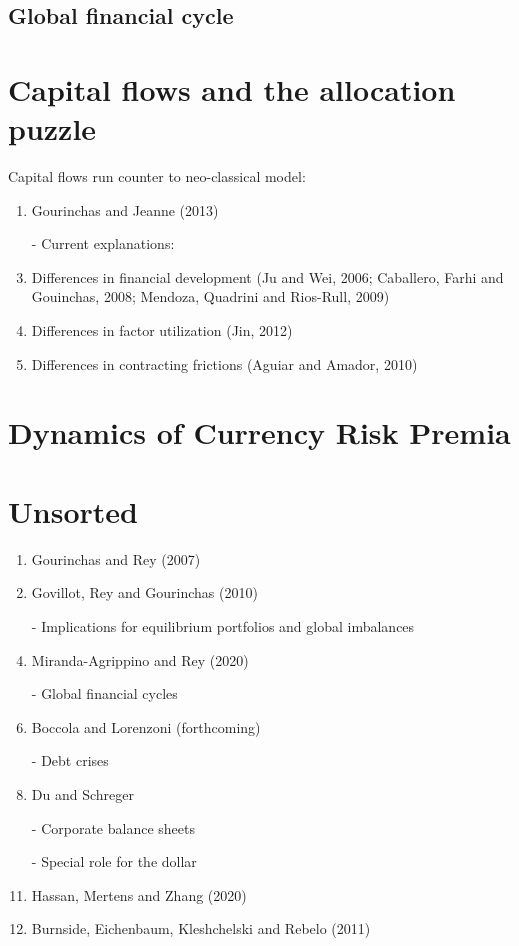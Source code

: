 \documentclass[12pt,letter]{article}
\theoremstyle{break} \theorembodyfont{\normalfont\itshape}
\theoremstyle{break}
\theoremstyle{break} \theorembodyfont{\normalfont\itshape}
\theoremstyle{break} \theorembodyfont{\normalfont\itshape}
\begin{document}
\subsection{Global financial cycle}

\section{Capital flows and the allocation puzzle}
Capital flows run counter to neo-classical model:
\begin{enumerate}
\item Gourinchas and Jeanne (2013)
\item[-] Current explanations:
\item Differences in financial development (Ju and Wei, 2006;
  Caballero, Farhi and Gouinchas, 2008; Mendoza, Quadrini and
  Rios-Rull, 2009)
\item Differences in factor utilization (Jin, 2012)
\item Differences in contracting frictions (Aguiar and Amador, 2010)
\end{enumerate}

\section{Dynamics of Currency Risk Premia}


\section{Unsorted}
\begin{enumerate}
\item Gourinchas and Rey (2007)
\item Govillot, Rey and Gourinchas (2010)
\item[-] Implications for equilibrium portfolios and global imbalances
\item Miranda-Agrippino and Rey (2020)
\item[-] Global financial cycles
\item Boccola and Lorenzoni (forthcoming)
\item[-] Debt crises
\item Du and Schreger
\item[-] Corporate balance sheets
\item[-] Special role for the dollar
\item Hassan, Mertens and Zhang (2020)
\item Burnside, Eichenbaum, Kleshchelski and Rebelo (2011)
\end{enumerate}
\end{document}
